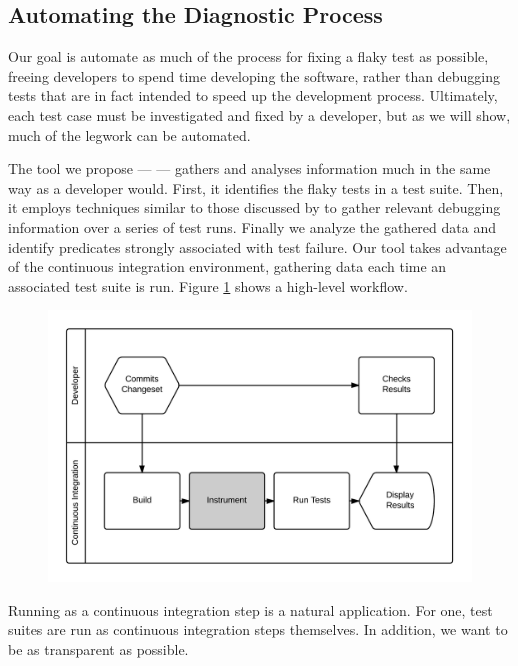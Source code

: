 \subsection{Automating the Diagnostic Process}

Our goal is automate as much of the process for fixing a flaky test as possible, freeing developers to spend time developing the software, rather than debugging tests that are in fact intended to speed up the development process. Ultimately, each test case must be investigated and fixed by a developer, but as we will show, much of the legwork can be automated.

The tool we propose --- \emph{\splatter} --- gathers and analyses information much in the same way as a developer would. First, it identifies the flaky tests in a test suite. Then, it employs techniques similar to those discussed by \citet{ArumugaNainar:2010:ABI:1806799.1806839} to gather relevant debugging information over a series of test runs. Finally we analyze the gathered data and identify predicates strongly associated with test failure. Our tool takes advantage of the continuous integration environment, gathering data each time an associated test suite is run. Figure \ref{fig:developer_workflow} shows a high-level \splatter workflow.

\begin{figure}[h]
\includegraphics[width=\linewidth]{images/developer_workflow}
\caption{}
\label{fig:developer_workflow}
\end{figure}

Running as a continuous integration step is a natural application. For one, test suites are run as continuous integration steps themselves. In addition, we want to be as transparent as possible.

